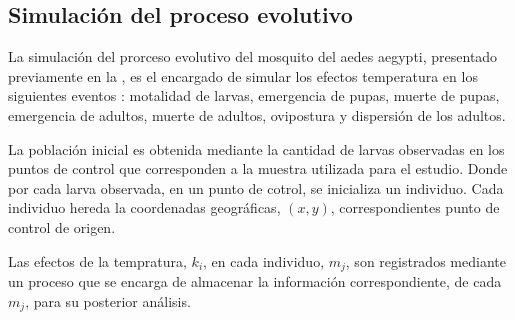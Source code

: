 \subsection{Simulación del proceso evolutivo}
La simulación del prorceso evolutivo del mosquito del aedes aegypti, presentado previamente en la
, es el encargado de simular los efectos temperatura
en los siguientes eventos : motalidad de larvas, emergencia de pupas, muerte de pupas, emergencia
de adultos, muerte de adultos, ovipostura y dispersión de los adultos.

La población inicial es obtenida mediante la cantidad de larvas observadas en los puntos de
control que corresponden a la muestra utilizada para el estudio. Donde por cada larva observada,
en un punto de cotrol, se inicializa un individuo. Cada individuo hereda la coordenadas
geográficas, $(x, y)$, correspondientes punto de control de origen.

Las efectos de la tempratura, $k_{i}$, en cada individuo, $m_{j}$, son registrados mediante un
proceso que se encarga de almacenar la información correspondiente, de cada $m_{j}$, para su
posterior análisis.
